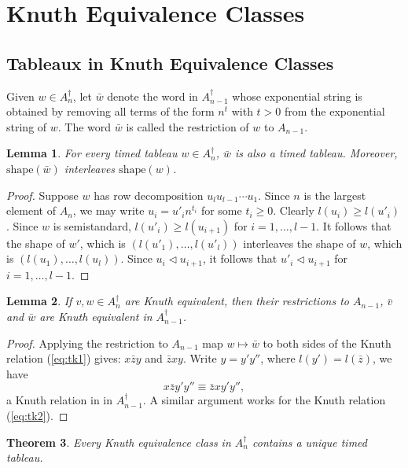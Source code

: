 \documentclass[10pt]{amsproc}
\newtheorem{theorem}{Theorem}[subsection]
\newtheorem{lemma}[theorem]{Lemma}
\theoremstyle{definition}
\theoremstyle{remark}
\newcommand{\shape}{\mathrm{shape}}
\begin{document}
\section{Knuth Equivalence Classes}
\label{sec:knuth-classes}
\subsection{Tableaux in Knuth Equivalence Classes}
\label{sec:tabl-knuth-equiv}
Given $w\in A_n^\dagger$, let $\bar w$ denote the word in $A_{n-1}^\dagger$ whose exponential string is obtained by removing all terms of the form $n^t$ with $t>0$ from the exponential string of $w$.
The word $\bar w$ is called the restriction of $w$ to $A_{n-1}$.
\begin{lemma}
  \label{lemma:restriction-interleaf}
  For every timed tableau $w\in A_n^\dagger$, $\bar w$ is also a timed tableau. Moreover, $\shape(\bar w)$ interleaves $\shape(w)$.
\end{lemma}
\begin{proof}
  Suppose $w$ has row decomposition $u_lu_{l-1}\dotsb u_1$.
  Since $n$ is the largest element of $A_n$, we may write $u_i=u'_in^{t_i}$ for some $t_i\geq 0$.
  Clearly $l(u_i)\geq l(u'_i)$.
  Since $w$ is semistandard, $l(u'_i)\geq l(u_{i+1})$ for $i=1,\dotsc,l-1$. 
  It follows that the shape of $w'$, which is $(l(u'_1),\dotsc,l(u'_l))$ interleaves the shape of $w$, which is $(l(u_1),\dotsc,l(u_l))$.
  Since $u_i\lhd u_{i+1}$, it follows that $u'_i\lhd u_{i+1}$ for $i=1,\dotsc,l-1$.
\end{proof}
\begin{lemma}
  \label{lemma:equivalence-restriction}
  If $v,w\in A_n^\dagger$ are Knuth equivalent, then their restrictions to $A_{n-1}$, $\bar v$ and $\bar w$ are Knuth equivalent in $A_{n-1}^\dagger$.
\end{lemma}
\begin{proof}
  Applying the restriction to $A_{n-1}$ map $w\mapsto \bar w$ to both sides of the Knuth relation (\ref{eq:tk1}) gives:
  $x\bar z y$ and $\bar z x y$.
  Write $y=y'y''$, where $l(y')=l(\bar z)$, we have
  \begin{displaymath}
    x\bar zy'y'' \equiv \bar zxy'y'',
  \end{displaymath}
  a Knuth relation in in $A_{n-1}^\dagger$.
  A similar argument works for the Knuth relation (\ref{eq:tk2}).
\end{proof}
\begin{theorem}
  \label{theorem:unique-timed-tableaux}
  Every Knuth equivalence class in $A_n^\dagger$ contains a unique timed tableau.
\end{theorem}
\end{document}
